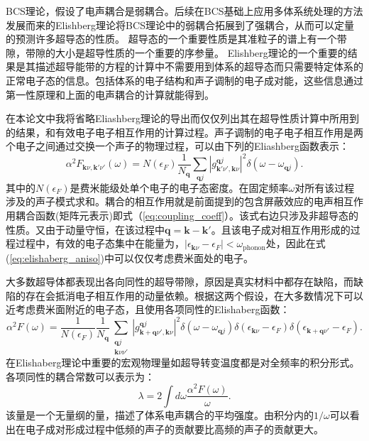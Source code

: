 BCS理论，假设了电声耦合是弱耦合。后续在BCS基础上应用多体系统处理的方法\cite{scalapino1969electron}发展而来的Elishberg理论\cite{eliashberg1960interactions}将BCS理论中的弱耦合拓展到了强耦合，从而可以定量的预测许多超导态的性质。
超导态的一个重要性质是其准粒子的谱上有一个带隙，带隙的大小是超导性质的一个重要的序参量。
Elishberg理论的一个重要的结果是其描述超导能带的方程的计算中不需要用到体系的超导态而只需要特定体系的正常电子态的信息。包括体系的电子结构和声子调制的电子成对能，这些信息通过第一性原理和上面的电声耦合的计算就能得到。

在本论文中我将省略Eliashberg理论的导出而仅仅列出其在超导性质计算中所用到的结果，和有效电子电子相互作用的计算过程。声子调制的电子电子相互作用是两个电子之间通过交换一个声子的物理过程，可以由下列的Eliashberg函数表示：
\begin{equation}\label{eq:elishaberg_aniso}
  \alpha^2 F_{\bm{k}\nu,\bm{k}'\nu'}(\omega) =
  N(\epsilon_F) \frac{1}{N_{\bm{q}}} \sum_{\bm{q}j}
  |g^{\bm{q}j}_{\bm{k}'\nu',\bm{k}\nu}|^2 \delta(\omega-\omega_{\bm{q}j}).
\end{equation}
其中的$N(\epsilon_F)$是费米能级处单个电子的电子态密度。在固定频率$\omega$对所有该过程涉及的声子模式求和。耦合的相互作用就是前面提到的包含屏蔽效应的电声相互作用耦合函数(矩阵元表示)即式（\ref{eq:coupling_coeff}）。该式右边只涉及非超导态的性质。又由于动量守恒，在该过程中$\bm{q}=\bm{k}-\bm{k}'$。且该电子成对相互作用形成的过程过程中，有效的电子态集中在能量为，$|\epsilon_{\bm{k}\nu}-\epsilon_F|<\omega_{\mathrm{phonon}}$处，因此在式(\ref{eq:elishaberg_aniso})中可以仅仅考虑费米面处的电子\cite{allen1983theory}。

大多数超导体都表现出各向同性的超导带隙，原因是真实材料中都存在缺陷，而缺陷的存在会抵消电子相互作用的动量依赖。根据这两个假设，在大多数情况下可以近考虑费米面附近的电子态，且使用各项同性的Elishaberg函数：
\begin{equation}\label{eq:elishaberg_iso}
  \alpha^2 F(\omega) = \frac{1}{N(\epsilon_F)}\frac{1}{N_{\bm{q}}}
  \sum_{\substack{\bm{q}j \\ \bm{k}\nu\nu'}} |g^{\bm{q}j}_{\bm{k}+\bm{q}\nu',\bm{k}\nu}|^2
  \delta(\omega-\omega_{\bm{q}j})
  \delta(\epsilon_{\bm{k}\nu}-\epsilon_{F})
  \delta(\epsilon_{\bm{k}+\bm{q}\nu'}-\epsilon_F).
\end{equation}
在Elishaberg理论中重要的宏观物理量如超导转变温度都是对全频率的积分形式。各项同性的耦合常数可以表示为：
\begin{equation}\label{eq:lambda_coupling}
  \lambda = 2 \int d\omega \frac{\alpha^2 F(\omega)}{\omega}.
\end{equation}
该量是一个无量纲的量，描述了体系电声耦合的平均强度。由积分内的$1/\omega$可以看出在电子成对形成过程中低频的声子的贡献要比高频的声子的贡献更大。

